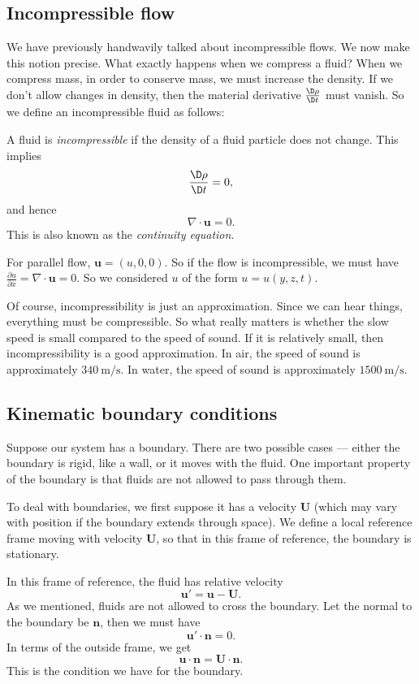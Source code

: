 \documentclass[a4paper]{article}
\begin{document}
\subsection{Incompressible flow}
We have previously handwavily talked about incompressible flows. We now make this notion precise. What exactly happens when we compress a fluid? When we compress mass, in order to conserve mass, we must increase the density. If we don't allow changes in density, then the material derivative $\frac{\D \rho}{\D t}$ must vanish. So we define an incompressible fluid as follows:
\begin{defi}
  A fluid is \emph{incompressible} if the density of a fluid particle does not change. This implies
  \[
    \frac{\D \rho}{\D t} = 0,
  \]
  and hence
  \[
    \nabla \cdot \mathbf{u} = 0.
  \]
  This is also known as the \emph{continuity equation}.
\end{defi}
For parallel flow, $\mathbf{u} = (u, 0, 0)$. So if the flow is incompressible, we must have $\frac{\partial u}{\partial x} = \nabla \cdot \mathbf{u} = 0$. So we considered $u$ of the form $u = u(y, z, t)$.

Of course, incompressibility is just an approximation. Since we can hear things, everything must be compressible. So what really matters is whether the slow speed is small compared to the speed of sound. If it is relatively small, then incompressibility is a good approximation. In air, the speed of sound is approximately $\SI{340}{\meter\per\second}$. In water, the speed of sound is approximately $\SI{1500}{\meter\per\second}$.

\subsection{Kinematic boundary conditions}
Suppose our system has a boundary. There are two possible cases --- either the boundary is rigid, like a wall, or it moves with the fluid. One important property of the boundary is that fluids are not allowed to pass through them.

To deal with boundaries, we first suppose it has a velocity $\mathbf{U}$ (which may vary with position if the boundary extends through space). We define a local reference frame moving with velocity $\mathbf{U}$, so that in this frame of reference, the boundary is stationary.

In this frame of reference, the fluid has relative velocity
\[
  \mathbf{u}' = \mathbf{u} - \mathbf{U}.
\]
As we mentioned, fluids are not allowed to cross the boundary. Let the normal to the boundary be $\mathbf{n}$, then we must have
\[
  \mathbf{u}' \cdot \mathbf{n} = 0.
\]
In terms of the outside frame, we get
\[
  \mathbf{u}\cdot \mathbf{n} = \mathbf{U} \cdot \mathbf{n}.
\]
This is the condition we have for the boundary.
\end{document}
